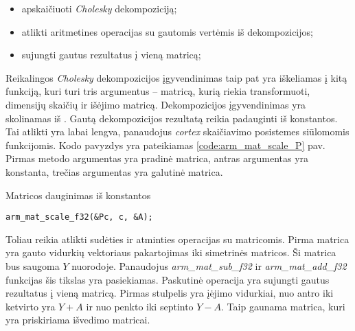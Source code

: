 \begin{itemize}
    \item apskaičiuoti \textit{Cholesky} dekompoziciją;
    \item atlikti aritmetines operacijas su gautomis vertėmis iš dekompozicijos;
    \item sujungti gautus rezultatus į vieną matricą;
\end{itemize}

Reikalingos \textit{Cholesky} dekompozicijos įgyvendinimas taip pat yra iškeliamas į kitą funkciją, kuri turi tris argumentus -- matricą, kurią riekia transformuoti, dimensijų skaičių ir išėjimo matricą.
Dekompozicijos įgyvendinimas yra skolinamas iš \cite{Cholesky6:online}.
Gautą dekompozicijos rezultatą reikia padauginti iš konstantos.
Tai atlikti yra labai lengva, panaudojus \textit{cortex} skaičiavimo posistemes siūlomomis funkcijomis.
Kodo pavyzdys yra pateikiamas \ref{code:arm_mat_scale_P} pav.
Pirmas metodo argumentas yra pradinė matrica, antras argumentas yra konstanta, trečias argumentas yra galutinė matrica.

\begin{cfigure}
    \centering
    \caption{Matricos dauginimas iš konstantos}
    \label{code:arm_mat_scale_P}
    \begin{lstlisting}
arm_mat_scale_f32(&Pc, c, &A);
    \end{lstlisting}
\end{cfigure}

Toliau reikia atlikti sudėties ir atminties operacijas su matricomis.
Pirma matrica yra gauto vidurkių vektoriaus pakartojimas iki simetrinės matricos.
Ši matrica bus saugoma $Y$ nuorodoje.
Panaudojus \textit{arm\_mat\_sub\_f32} ir \textit{arm\_mat\_add\_f32} funkcijas šis tikslas yra pasiekiamas.
Paskutinė operacija yra sujungti gautus rezultatus į vieną matricą.
Pirmas stulpelis yra įėjimo vidurkiai, nuo antro iki ketvirto yra $Y+A$ ir nuo penkto iki septinto $Y-A$.
Taip gaunama matrica, kuri yra priskiriama išvedimo matricai.

